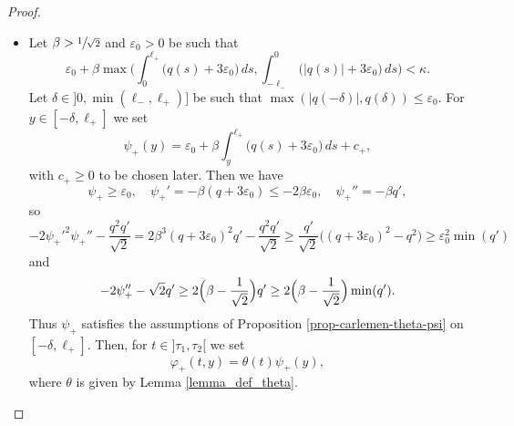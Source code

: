 \documentclass[JEP,XML,SOM,Unicode]{cedram}
\theoremstyle{plain}
\theoremstyle{definition}
\newcommand{\abs}[1]{\vert #1\vert}
\newcommand{\1}{\mathds 1}
\let\d\delta
\let\e\varepsilon
\let\th\theta
\let\k\kappa
\let\f\varphi
\begin{document}
\skpt
\begin{proof}
\begin{itemize}
\item
Let $\beta > \sfrac 1 {\sqrt 2}$ and $\e_0 > 0$ be such that
\begin{equation} \label{eq-eps-kappa}
\e_0 + \beta \max\biggl(\int_{0}^{\ell_+} \bigl(q(s) + 3 \e_0 \bigr) \, ds, \int_{-\ell_-}^0 \bigl(\abs{q(s)} + 3 \e_0 \bigr) \,ds \biggr) < \k.
\end{equation}
Let $\d \in{}]0,\min(\ell_-,\ell_+)]$ be such that $\max(\abs{q(-\delta)},q(\delta)) \leq \e_0$. For $y \in [-\d,\ell_+]$ we set
\[
\psi_+(y) = \e_0 + \beta \int_{y}^{\ell_+} \bigl(q(s)+3\e_0 \bigr) \, ds + c_+,
\]
with $c_+ \geq 0$ to be chosen later.
Then we have
\[
\psi_+ \geq \e_0, \quad \psi_+' = -\beta (q + 3 \e_0) \leq - 2 \beta \e_0, \quad \psi_+'' = - \beta q',
\]
so
\[
- 2 \psi_+'^2 \psi_+'' - \frac {q^2 q'}{\sqrt 2}
 = 2 \beta^3 (q+3\e_0)^2 q' - \frac {q^2 q'}{\sqrt 2}\geq \frac {q'}{\sqrt 2} \bigl((q+3\e_0)^2 - q^2 \bigr)\geq \e_0^2 \min(q')
\]
and
\[
- 2 \psi_+'' - \sqrt 2 q' \geq 2 \Bigl(\beta - \frac{1}{\sqrt 2}\Bigr) q' \geq 2 \Bigl(\beta - \frac{1}{\sqrt 2}\Bigr) \min(q').
\]
Thus $\psi_+$ satisfies the assumptions of Proposition \ref{prop-carlemen-theta-psi} on $[-\d,\ell_+]$.
Then, for $t \in{}]\tau_1,\tau_2[$ we set
\begin{equation} \label{def-phi-+}
\f_+(t,y) = \th(t) \psi_+(y),
\end{equation}
where $\th$ is given by Lemma \ref{lemma_def_theta}.


\end{itemize}
\end{proof}
\end{document}
